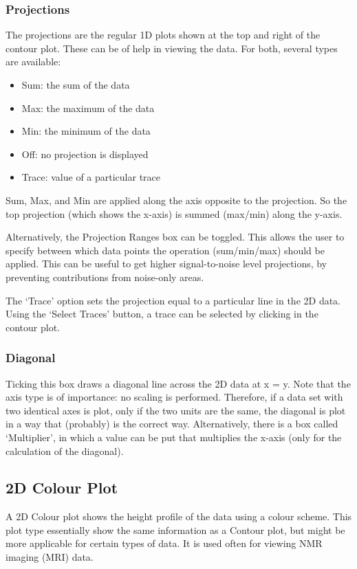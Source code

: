\documentclass[11pt,a4paper]{article}
\begin{document}
\subsubsection*{Projections}
The projections are the regular 1D plots shown at the top and right of the contour plot. These can be of help in viewing the data.
For both, several types are available:
\begin{itemize}
  \item Sum: the sum of the data
  \item Max: the maximum of the data
  \item Min: the minimum of the data
  \item Off: no projection is displayed
  \item Trace: value of a particular trace
\end{itemize}
Sum, Max, and Min are applied along the axis opposite to the projection. So the top projection
(which shows the x-axis) is summed (max/min) along the y-axis.

Alternatively, the Projection Ranges box can be toggled. This allows the user to specify between
which data points the operation (sum/min/max) should be applied.  This can be useful to get higher
signal-to-noise level projections, by preventing contributions from noise-only areas.

The `Trace' option sets the projection equal to a particular line in the 2D data. Using the `Select
Traces' button, a trace can be selected by clicking in the contour plot.

\subsubsection*{Diagonal}
Ticking this box draws a diagonal line across the 2D data at x = y. Note that the axis type is of importance: no scaling is performed.
Therefore, if a data set with two identical axes is plot, only if the two units are the same, the diagonal is plot in a way that (probably) is the correct way.
Alternatively, there is a box called `Multiplier', in which a value can be put that multiplies the x-axis (only for the calculation of the diagonal).

\subsection{2D Colour Plot}
A 2D Colour plot shows the height profile of the data using a colour scheme.
This plot type essentially show the same information as a Contour plot, but might
be more applicable for certain types of data. It is used often for viewing NMR imaging (MRI) data.
\end{document}
